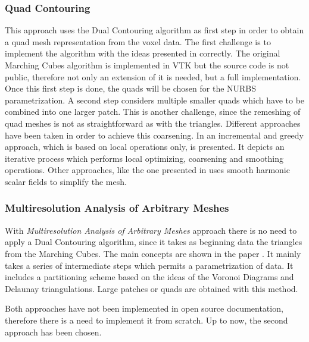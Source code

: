 \subsubsection{Quad Contouring}
This approach uses the Dual Contouring algorithm as first step in order to obtain a quad mesh
representation from the voxel data. The first challenge is to implement the algorithm
with the ideas presented in \cite{Hermite2002} correctly. The original Marching Cubes algorithm is
implemented in VTK but the source code is not public, therefore not only an extension
of it is needed, but a full implementation. Once this first step is done, the quads will be chosen for the
NURBS parametrization. A second step considers multiple smaller quads which have to be
combined into one larger patch. This is another challenge, since the remeshing of quad meshes
is not as straightforward as with the triangles. Different approaches have been taken in order to achieve this coarsening. In \cite{Puppo2010} an incremental and greedy approach, which is based on local operations only, is presented. It depicts an iterative process which performs local optimizing, coarsening and smoothing operations. Other approaches, like the one presented in \cite{Dong2005} uses smooth harmonic scalar fields to simplify the mesh.



\subsubsection{Multiresolution Analysis of Arbitrary Meshes}
With \textit{Multiresolution Analysis of Arbitrary Meshes} approach there is no need to apply a Dual Contouring algorithm, since it takes as
beginning data the triangles from the Marching Cubes. The main concepts are shown in the paper \cite{eck1996automatic}. It mainly takes a series of intermediate steps which permits a parametrization of data. It includes a partitioning scheme based on the ideas of the Voronoi Diagrams and Delaunay triangulations. Large patches or quads are obtained with this method. 


Both approaches have not been implemented in open source documentation, therefore there is a need to implement it from scratch. Up to now, the second approach has been chosen.

